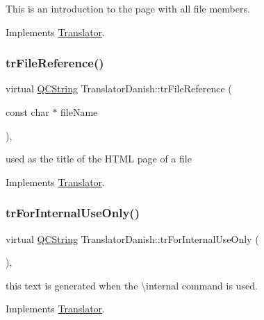 This is an introduction to the page with all file members. 

Implements \mbox{\hyperlink{class_translator}{Translator}}.

\mbox{\label{class_translator_danish_a60dce0cf4cd29e7c4873a77d746f879d}} 
\subsubsection{\texorpdfstring{trFileReference()}{trFileReference()}}
{\footnotesize\ttfamily virtual \mbox{\hyperlink{class_q_c_string}{Q\+C\+String}} Translator\+Danish\+::tr\+File\+Reference (\begin{DoxyParamCaption}\item[{const char $\ast$}]{file\+Name }\end{DoxyParamCaption})\hspace{0.3cm}{\ttfamily [inline]}, {\ttfamily [virtual]}}

used as the title of the H\+T\+ML page of a file 

Implements \mbox{\hyperlink{class_translator}{Translator}}.

\mbox{\label{class_translator_danish_a33302b45ae174db34bb205bc05250384}} 
\subsubsection{\texorpdfstring{trForInternalUseOnly()}{trForInternalUseOnly()}}
{\footnotesize\ttfamily virtual \mbox{\hyperlink{class_q_c_string}{Q\+C\+String}} Translator\+Danish\+::tr\+For\+Internal\+Use\+Only (\begin{DoxyParamCaption}{ }\end{DoxyParamCaption})\hspace{0.3cm}{\ttfamily [inline]}, {\ttfamily [virtual]}}

this text is generated when the \textbackslash{}internal command is used. 

Implements \mbox{\hyperlink{class_translator}{Translator}}.

\mbox{\label{class_translator_danish_a34ae3117946ec380fb220149b897366f}} 
